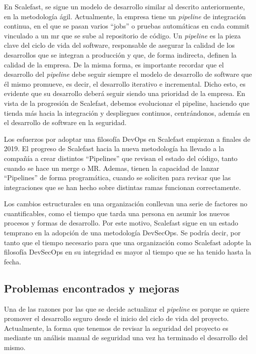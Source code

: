 \documentclass[12pt]{report} %
\begin{document}
En Scalefast, se sigue un modelo de desarrollo similar al descrito
anteriormente, en la metodología ágil.  Actualmente, la empresa tiene un
\textit{\gls{pipeline}} de integración continua, en el que se pasan varios
``jobs'' o pruebas automáticas en cada commit vinculado a un \acrfull{mr} que se
sube al repositorio de código.  
Un \textit{\gls{pipeline}} es la pieza clave del
ciclo de vida del software, responsable de asegurar la calidad de los
desarrollos que se integran a producción y que, de forma indirecta,
definen la calidad de la empresa.  De la misma forma, es importante recordar que el
desarrollo del \textit{\gls{pipeline}} debe seguir siempre el modelo de
desarrollo de software que él mismo promueve, es decir, el desarrollo iterativo e
incremental.  Dicho esto, es evidente que su desarrollo deberá seguir
siendo una prioridad de la empresa.  En vista de la progresión de Scalefast,
debemos evolucionar el pipeline, haciendo que tienda más hacia la integración y
despliegues continuos, centrándonos, además en el desarrollo de software en la
seguridad.  

Los esfuerzos por adoptar una filosofía \gls{DevOps} en Scalefast empiezan a
finales de 2019.
El progreso de Scalefast hacia la nueva metodología ha llevado a la compañía a
crear distintos ``Pipelines'' que revisan el estado del código, tanto cuando se
hace un \gls{merge} o \gls{MR}.
Ademas, tienen la capacidad de lanzar ``Pipelines'' de forma programática,
cuando se soliciten para revisar que las integraciones que se han hecho sobre
distintas ramas funcionan correctamente.

Los cambios estructurales en una organización conllevan una serie de factores no
cuantificables, como el tiempo que tarda una persona en asumir los nuevos
procesos y formas de desarrollo.
Por este motivo, Scalefast sigue en un estado temprano en la adopción de
una metodología \gls{DevSecOps}.
Se podría decir, por tanto que el tiempo necesario para que una organización
como Scalefast adopte la filosofía \gls{DevSecOps} en su integridad es mayor al
tiempo que se ha tenido hasta la fecha.

\subsection{Problemas encontrados y mejoras}

Una de las razones por las que se decide actualizar el \textit{\gls{pipeline}}
es porque se quiere promover el desarrollo seguro desde el inicio del ciclo de
vida del proyecto.  Actualmente, la forma que tenemos de revisar la seguridad
del proyecto es mediante un análisis manual de seguridad una vez ha
terminado el desarrollo del mismo.  
\end{document}
